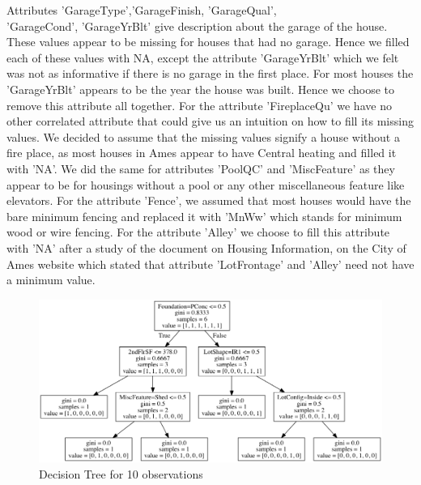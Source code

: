 \documentclass[fleqn,10pt]{SelfArx} %
\begin{document}
	Attributes 'GarageType','GarageFinish, 'GarageQual',\\'GarageCond', 'GarageYrBlt' give description about the garage of the house. These values appear to be missing for houses that had no garage. Hence we filled each of these values with NA, except the attribute 'GarageYrBlt' which we felt was not as informative if there is no garage in the first place. For most houses the 'GarageYrBlt' appears to be the year the house was built. Hence we choose to remove this attribute all together. For the attribute 'FireplaceQu' we have no other correlated attribute that could give us an intuition on how to fill its missing values. We decided to assume that the missing values signify a house without a fire place, as most houses in Ames appear to have Central heating and filled it with 'NA'. We did the same for attributes 'PoolQC' and 'MiscFeature' as they appear to be for housings without a pool or any other miscellaneous feature like elevators. For the attribute 'Fence', we assumed that most houses would have the bare minimum fencing and replaced it with 'MnWw' which stands for minimum wood or wire fencing. For the attribute 'Alley' we choose to fill this attribute with 'NA' after a study of the document on Housing Information, on the City of Ames website which stated that attribute 'LotFrontage' and 'Alley' need not have a minimum value\cite{ames}.
	\begin{figure}[ht]\centering %
		\includegraphics[width=\linewidth]{tree_diagram_10samples}
		\caption{Decision Tree for 10 observations}
		\label{fig:tree_diagram_10samples}
	\end{figure}
\end{document}
